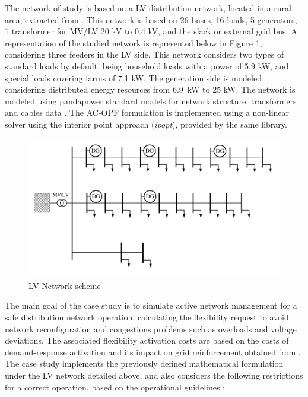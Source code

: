 The network of study is based on a LV distribution network, located in a rural area, extracted from \cite{Linder2014}. This network is based on 26 buses, 16 loads, 5 generators, 1 transformer for MV/LV 20 kV to 0.4 kV, and the slack or external grid bus. A representation of the studied network is represented below in Figure \ref{fig:case_study_LV}, considering three feeders in the LV side. 
This network considers two types of standard loads by default, being household loads with a power of 5.9 kW, and special loads covering farms of 7.1 kW. The generation side is modeled considering distributed energy resources from 6.9~kW to 25 kW. The network is modeled using pandapower standard models for network structure, transformers and cables data \cite{Thurner_2018}. The AC-OPF formulation is implemented using a non-linear solver using the interior point approach (\textit{ipopt}), provided by the same library. 
\vspace{10mm}
\begin{figure}[htbp]
	\centering
	\includegraphics[width=1\columnwidth ]{ChapterOPF_DSO/Figures/LV_network_2.pdf}
		\caption{LV Network scheme}
	\label{fig:case_study_LV}  
\end{figure}

The main goal of the case study is to simulate active network management for a safe distribution network operation, calculating the flexibility request to avoid network reconfiguration and congestions problems such as overloads and voltage deviations. The associated flexibility activation costs are based on the costs of demand-response activation and its impact on grid reinforcement obtained from \cite{EUCommision-DGEnergy2016, Saygn2019}. The case study implements the previously defined mathematical formulation under the LV network detailed above, and also considers the following restrictions for a correct operation, based on the operational guidelines \cite{BAYER2020336, Giannelos2016}: 

